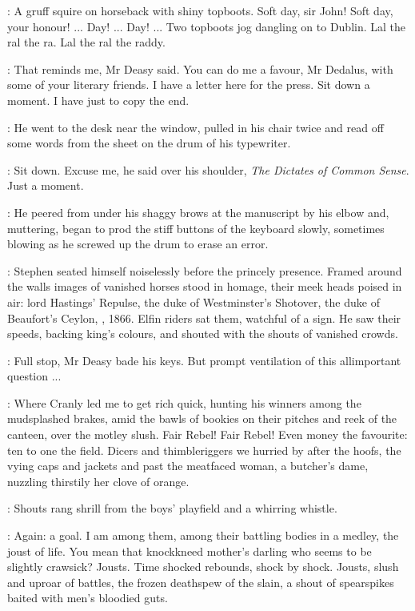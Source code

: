 \StephenInt:
A gruff squire on horseback with shiny topboots. Soft day, sir John!
Soft day, your honour! ... Day! ... Day! ... Two topboots jog dangling
on to Dublin. Lal the ral the ra. Lal the ral the raddy.

\deasy:
That reminds me, Mr Deasy said. You can do me a favour, Mr Dedalus,
with some of your literary friends. I have a letter here for the press.
Sit down a moment. I have just to copy the end.

:
He went to the desk near the window, pulled in his chair twice and
read off some words from the sheet on the drum of his typewriter.

\deasy:
Sit down. Excuse me, he said over his shoulder, \emph{The Dictates of Common Sense}.
Just a moment.

:
He peered from under his shaggy brows at the manuscript by his
elbow and, muttering, began to prod the stiff buttons of the keyboard
slowly, sometimes blowing as he screwed up the drum to erase an error.

:
Stephen seated himself noiselessly before the princely presence.
Framed around the walls images of vanished horses stood in homage, their
meek heads poised in air: lord Hastings' Repulse, the duke of
Westminster's Shotover, the duke of Beaufort's Ceylon, ,
1866. Elfin riders sat them, watchful of a sign. He saw their speeds,
backing king's colours, and shouted with the shouts of vanished crowds.

\deasy:
Full stop, Mr Deasy bade his keys. But prompt ventilation of this
allimportant question ...

\StephenInt:
Where Cranly led me to get rich quick, hunting his winners among
the mudsplashed brakes, amid the bawls of bookies on their pitches and
reek of the canteen, over the motley slush. Fair Rebel! Fair Rebel! Even
money the favourite: ten to one the field. Dicers and thimbleriggers we
hurried by after the hoofs, the vying caps and jackets and past the
meatfaced woman, a butcher's dame, nuzzling thirstily her clove of orange.

:
Shouts rang shrill from the boys' playfield and a whirring whistle.

\StephenInt:
Again: a goal. I am among them, among their battling bodies in a
medley, the joust of life. You mean that knockkneed mother's darling who
seems to be slightly crawsick? Jousts. Time shocked rebounds, shock by
shock. Jousts, slush and uproar of battles, the frozen deathspew of the
slain, a shout of spearspikes baited with men's bloodied guts.

